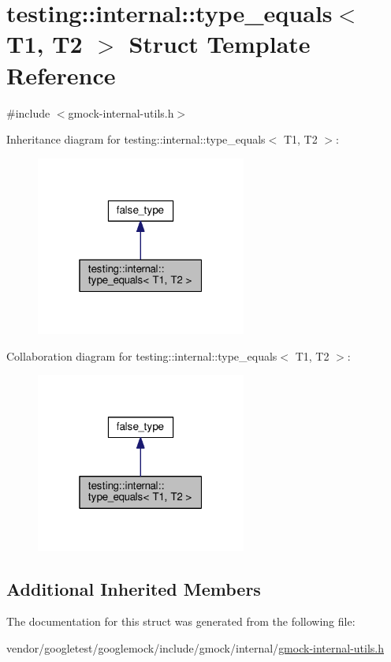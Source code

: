 \hypertarget{structtesting_1_1internal_1_1type__equals}{}\section{testing\+:\+:internal\+:\+:type\+\_\+equals$<$ T1, T2 $>$ Struct Template Reference}
\label{structtesting_1_1internal_1_1type__equals}


{\ttfamily \#include $<$gmock-\/internal-\/utils.\+h$>$}



Inheritance diagram for testing\+:\+:internal\+:\+:type\+\_\+equals$<$ T1, T2 $>$\+:\nopagebreak
\begin{figure}[H]
\begin{center}
\leavevmode
\includegraphics[width=196pt]{structtesting_1_1internal_1_1type__equals__inherit__graph}
\end{center}
\end{figure}


Collaboration diagram for testing\+:\+:internal\+:\+:type\+\_\+equals$<$ T1, T2 $>$\+:\nopagebreak
\begin{figure}[H]
\begin{center}
\leavevmode
\includegraphics[width=196pt]{structtesting_1_1internal_1_1type__equals__coll__graph}
\end{center}
\end{figure}
\subsection*{Additional Inherited Members}


The documentation for this struct was generated from the following file\+:\begin{DoxyCompactItemize}
\item 
vendor/googletest/googlemock/include/gmock/internal/\hyperlink{gmock-internal-utils_8h}{gmock-\/internal-\/utils.\+h}\end{DoxyCompactItemize}
